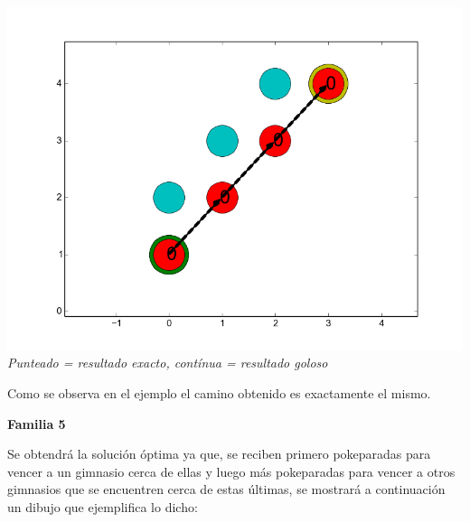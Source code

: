    \vspace*{0.3cm} \vspace*{0.3cm}
  \begin{center}
\includegraphics[scale=0.40]{./EJ2/todos0.png}
\\{\textit{Punteado = resultado exacto, contínua = resultado goloso}}
  \end{center}
  \vspace*{0.3cm}

Como se observa en el ejemplo el camino obtenido es exactamente el mismo.


\begin{center}
\textbf{Familia 5}
\end{center}

Se obtendr\'a la soluci\'on \'optima ya que, se reciben primero pokeparadas para vencer a un gimnasio cerca de ellas y luego m\'as pokeparadas para vencer a otros gimnasios que se encuentren cerca de estas \'ultimas, se mostrar\'a a continuaci\'on un dibujo que ejemplifica lo dicho:

